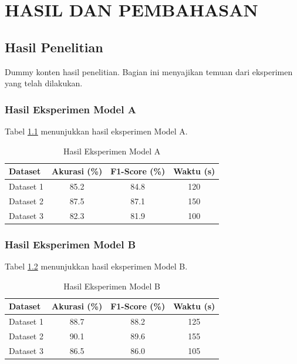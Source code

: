 \chapter{HASIL DAN PEMBAHASAN}
\label{bab:hasil_pembahasan}

\section{Hasil Penelitian}
\label{sec:hasil}

Dummy konten hasil penelitian. Bagian ini menyajikan temuan dari eksperimen yang telah dilakukan.

\subsection{Hasil Eksperimen Model A}
\label{subsec:hasil_model_a}

Tabel \ref{tab:hasil_a} menunjukkan hasil eksperimen Model A.

\begin{table}[h]
    \centering
    \caption{Hasil Eksperimen Model A}
    \label{tab:hasil_a}
    \begin{tabularx}{\textwidth}{X c c c}
        \toprule
        \textbf{Dataset} & \textbf{Akurasi (\%)} & \textbf{F1-Score (\%)} & \textbf{Waktu (s)} \\
        \midrule
        Dataset 1 & 85.2 & 84.8 & 120 \\
        Dataset 2 & 87.5 & 87.1 & 150 \\
        Dataset 3 & 82.3 & 81.9 & 100 \\
        \bottomrule
    \end{tabularx}
\end{table}

\subsection{Hasil Eksperimen Model B}
\label{subsec:hasil_model_b}

Tabel \ref{tab:hasil_b} menunjukkan hasil eksperimen Model B.

\begin{table}[h]
    \centering
    \caption{Hasil Eksperimen Model B}
    \label{tab:hasil_b}
    \begin{tabularx}{\textwidth}{X c c c}
        \toprule
        \textbf{Dataset} & \textbf{Akurasi (\%)} & \textbf{F1-Score (\%)} & \textbf{Waktu (s)} \\
        \midrule
        Dataset 1 & 88.7 & 88.2 & 125 \\
        Dataset 2 & 90.1 & 89.6 & 155 \\
        Dataset 3 & 86.5 & 86.0 & 105 \\
        \bottomrule
    \end{tabularx}
\end{table}

